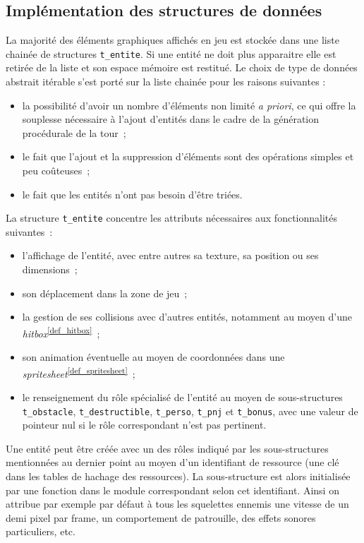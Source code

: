 \documentclass[a4paper,12pt]{article}
\newcommand\refsuscrite[1]{\textsuperscript{\ref{#1}}}
\begin{document}
\subsection{Implémentation des structures de données}

La majorité des éléments graphiques affichés en jeu est stockée dans une liste chainée de structures \texttt{t\_entite}.
Si une entité ne doit plus apparaitre elle est retirée de la liste et son espace mémoire est restitué.
Le choix de type de données abstrait itérable s’est porté sur la liste chainée pour les raisons suivantes :
\begin{itemize}
    \item la possibilité d’avoir un nombre d’éléments non limité \textit{a priori}, ce qui offre la souplesse nécessaire à l’ajout d’entités dans le cadre de la génération procédurale de la tour ;
    \item le fait que l’ajout et la suppression d’éléments sont des opérations simples et peu coûteuses ;
    \item le fait que les entités n’ont pas besoin d’être triées.
\end{itemize}

La structure \texttt{t\_entite} concentre les attributs nécessaires aux fonctionnalités suivantes :
\begin{itemize}
	\item l’affichage de l’entité, avec entre autres sa texture, sa position ou ses dimensions ;
	\item son déplacement dans la zone de jeu ;
	\item la gestion de ses collisions avec d’autres entités, notamment au moyen d’une \textit{hitbox}\refsuscrite{def_hitbox} ;
	\item son animation éventuelle au moyen de coordonnées dans une \textit{spritesheet}\refsuscrite{def_spritesheet} ;
	\item le renseignement du rôle spécialisé de l’entité au moyen de sous-structures \texttt{t\_obstacle}, \texttt{t\_destructible}, \texttt{t\_perso}, \texttt{t\_pnj} et \texttt{t\_bonus}, avec une valeur de pointeur nul si le rôle correspondant n’est pas pertinent.
\end{itemize}
Une entité peut être créée avec un des rôles indiqué par les sous-structures mentionnées au dernier point au moyen d’un identifiant de ressource (une clé dans les tables de hachage des ressources). La sous-structure est alors initialisée par une fonction dans le module correspondant selon cet identifiant. Ainsi on attribue par exemple par défaut à tous les squelettes ennemis une vitesse de un demi pixel par frame, un comportement de patrouille, des effets sonores particuliers, etc.
\end{document}
